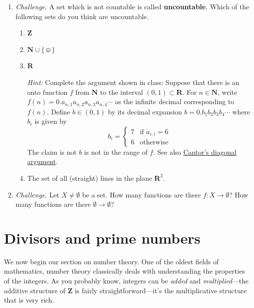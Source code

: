 \documentclass[12pt]{article}
\numberwithin{equation}{subsection}
\theoremstyle{note}
\begin{document}
\begin{enumerate}[label=\arabic*.]
	\item \textit{Challenge}. A set which is not countable is called \textbf{uncountable}. Which of the following sets do you think are uncountable. 
	\begin{enumerate}
		\item $\mathbf{Z}$
		\item $\mathbf{N}\cup \{\smiley\}$
		\item $\mathbf{R}$ 
		 {\color{violet}
		 
		 \textit{Hint:} Complete the argument shown in class: Suppose that there is an onto function $f$ from $\mathbf{N}$ to the interval $(0,1)\subset \mathbf{R}$. For $n\in \mathbf{N}$, write $f(n)=0.a_{n,1}a_{n,2}a_{n,3}a_{n,4}\cdots$ as the infinite decimal corresponding to $f(n)$. Define $b\in (0,1)$ by its decimal expansion $b=0.b_1b_2b_3b_4\cdots$ where $b_i$ is given by \[ b_i=\begin{cases} 7 & \text{if } a_{i,i}=6 \\ 6 & \text{otherwise} \end{cases} \] The claim is not $b$ is not in the range of $f$. See also \href{https://en.wikipedia.org/wiki/Cantor\%27s_diagonal_argument}{Cantor's diagonal argument}. }
		
		\item The set of all (straight) lines in the plane $\mathbf{R}^2$. 
	\end{enumerate}
	
	\item \textit{Challenge}. Let $X\neq \emptyset$ be a set. How many functions are there $f\colon X\to \emptyset$? How many functions are there $\emptyset \to \emptyset$?
		
\end{enumerate}










\section{Divisors and prime numbers}

We now begin our section on number theory. One of the oldest fields of mathematics, number theory classically deals with understanding the properties of the integers. As you probably know, integers can be \textit{added} and \textit{multiplied}---the additive structure of $\mathbf{Z}$ is fairly straightforward---it's the multiplicative structure that is very rich. 
\end{document}
